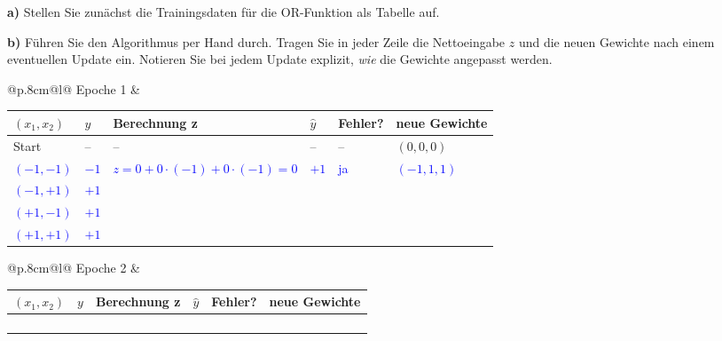 \documentclass[ngerman,11pt]{article}
\begin{document}
\medskip
\noindent \textbf{a)} Stellen Sie zunächst die Trainingsdaten für die OR-Funktion als Tabelle auf.

\medskip
\noindent \textbf{b)} Führen Sie den Algorithmus per Hand durch. Tragen Sie in jeder Zeile die Nettoeingabe $z$ und die neuen Gewichte nach einem eventuellen Update ein. Notieren Sie bei jedem Update explizit, \emph{wie} die Gewichte angepasst werden.

\medskip
\noindent\begin{tabular}{@{}p{.8cm}@{}l@{}}
\hspace{-0.5cm}\tiny{Epoche 1} &
\begin{tabular}{|>{\centering\arraybackslash}p{1.5cm}|>{\centering\arraybackslash}p{0.8cm}|p{6cm}|>{\centering\arraybackslash}p{0.8cm}|>{\centering\arraybackslash}p{1.2cm}|>{\centering\arraybackslash}p{2.4cm}|}
\hline
$(x_1, x_2)$ & $y$ & Berechnung z & $\hat y$ & \small{Fehler?} & \small{neue Gewichte} \\
\hline
Start & -- & -- & -- & -- & $(0, 0, 0)$ \\
\hline
\textcolor{blue}{$(-1,-1)$} & \textcolor{blue}{$-1$} & \textcolor{blue}{$z = 0 + 0\cdot(-1) + 0\cdot(-1) = 0$} & \textcolor{blue}{$+1$} & \textcolor{blue}{ja} & \textcolor{blue}{$(-1,1,1)$} \\[8pt]
\hline
\textcolor{blue}{$(-1,+1)$} & \textcolor{blue}{$+1$} & & & & \\[8pt]
\hline
\textcolor{blue}{$(+1,-1)$} & \textcolor{blue}{$+1$} & & & & \\[8pt]
\hline
\textcolor{blue}{$(+1,+1)$} & \textcolor{blue}{$+1$} & & & & \\[8pt]
\hline
\end{tabular}
\end{tabular}

\medskip
\noindent\begin{tabular}{@{}p{.8cm}@{}l@{}}
\hspace{-0.5cm}\tiny{Epoche 2} &
\begin{tabular}{|>{\centering\arraybackslash}p{1.5cm}|>{\centering\arraybackslash}p{0.8cm}|p{6cm}|>{\centering\arraybackslash}p{0.8cm}|>{\centering\arraybackslash}p{1.2cm}|>{\centering\arraybackslash}p{2.4cm}|}
\hline
$(x_1, x_2)$ & $y$ & Berechnung z & $\hat y$ & \small{Fehler?} & \small{neue Gewichte} \\
\hline
 & & & & & \\[8pt]
\hline
 & & & & & \\[8pt]
\hline
 & & & & & \\[8pt]
\hline
 & & & & & \\[8pt]
\hline
\end{tabular}
\end{tabular}
\end{document}
